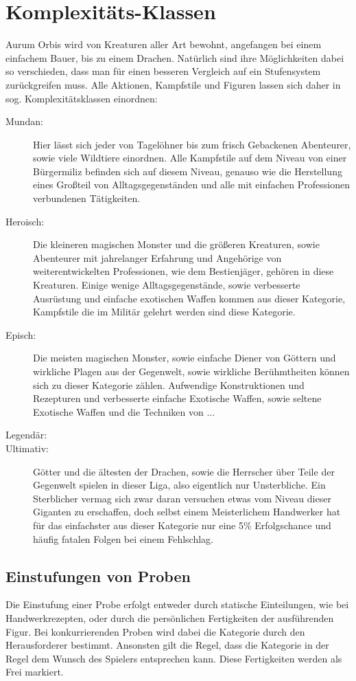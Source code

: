 \documentclass[a4paper,12pt,oneside]{book}
\begin{document}
\chapter{Komplexitäts-Klassen}
Aurum Orbis wird von Kreaturen aller Art bewohnt, angefangen bei einem einfachem Bauer, bis zu einem Drachen. Natürlich sind ihre Möglichkeiten dabei so verschieden, dass man für einen besseren Vergleich auf ein Stufensystem zurückgreifen muss. Alle Aktionen, Kampfstile und Figuren lassen sich daher in sog. Komplexitätsklassen einordnen:
\begin{description}
\item[Mundan:] Hier lässt sich jeder von Tagelöhner bis zum frisch Gebackenen Abenteurer, sowie viele Wildtiere einordnen. Alle Kampfstile auf dem Niveau von einer Bürgermiliz befinden sich auf diesem Niveau, genauso wie die Herstellung eines Großteil von Alltagsgegenständen und alle mit einfachen Professionen verbundenen Tätigkeiten.
\item[Heroisch:] Die kleineren magischen Monster und die größeren Kreaturen, sowie Abenteurer mit jahrelanger Erfahrung und Angehörige von weiterentwickelten Professionen, wie dem Bestienjäger, gehören in diese Kreaturen. Einige wenige Alltagsgegenstände, sowie verbesserte Ausrüstung und einfache exotischen Waffen kommen aus dieser Kategorie, Kampfstile die im Militär gelehrt werden sind diese Kategorie.
\item[Episch:]Die meisten magischen Monster, sowie einfache Diener von Göttern und wirkliche Plagen aus der Gegenwelt, sowie wirkliche Berühmtheiten können sich zu dieser Kategorie zählen. Aufwendige Konstruktionen und Rezepturen und verbesserte einfache Exotische Waffen, sowie seltene Exotische Waffen und die Techniken von ...
\item[Legendär:]
\item[Ultimativ:]Götter und die ältesten der Drachen, sowie die Herrscher über Teile der Gegenwelt spielen in dieser Liga, also eigentlich nur Unsterbliche. Ein Sterblicher vermag sich zwar daran versuchen etwas vom Niveau dieser Giganten zu erschaffen, doch selbst einem Meisterlichem Handwerker hat für das einfachster aus dieser Kategorie nur eine 5\% Erfolgschance und häufig fatalen Folgen bei einem Fehlschlag.
\end{description}
\section{Einstufungen von Proben}
Die Einstufung einer Probe erfolgt entweder durch statische Einteilungen, wie bei Handwerkrezepten, oder durch die persönlichen Fertigkeiten der ausführenden Figur. Bei konkurrierenden Proben wird dabei die Kategorie durch den Herausforderer bestimmt. Ansonsten gilt die Regel, dass die Kategorie in der Regel dem Wunsch des Spielers entsprechen kann. Diese Fertigkeiten werden als Frei markiert.
\end{document}
